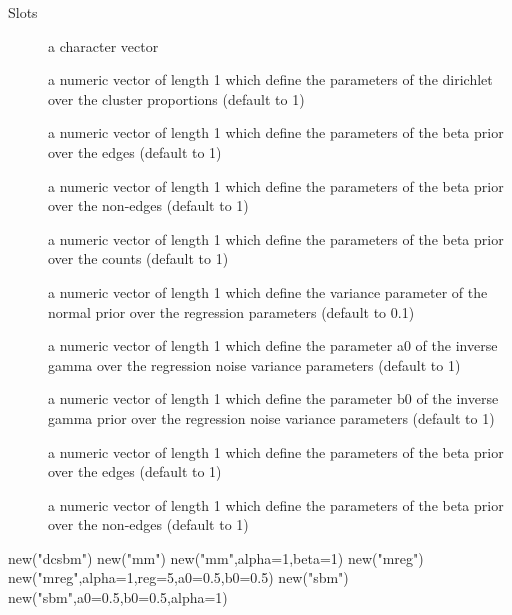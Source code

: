 \documentclass[letterpaper]{book}
\begin{document}
%
\begin{Section}{Slots}

\begin{description}

\item[] a character vector

\item[] a numeric vector of length 1 which define the parameters of the dirichlet over the cluster proportions (default to 1)

\item[] a numeric vector of length 1 which define the parameters of the beta prior over the edges (default to 1)

\item[] a numeric vector of length 1 which define the parameters of the beta prior over the non-edges (default to 1)

\item[] a numeric vector of length 1 which define the parameters of the beta prior over the counts (default to 1)

\item[] a numeric vector of length 1 which define the variance parameter of the normal prior over the regression parameters (default to 0.1)

\item[] a numeric vector of length 1 which define the parameter a0 of the inverse gamma over the regression noise variance parameters (default to 1)

\item[] a numeric vector of length 1 which define the parameter b0 of the inverse gamma prior over the regression noise variance parameters (default to 1)

\item[] a numeric vector of length 1 which define the parameters of the beta prior over the edges (default to 1)

\item[] a numeric vector of length 1 which define the parameters of the beta prior over the non-edges (default to 1)

\end{description}
\end{Section}
%
\begin{Examples}
\begin{ExampleCode}
new("dcsbm")
new("mm")
new("mm",alpha=1,beta=1)
new("mreg")
new("mreg",alpha=1,reg=5,a0=0.5,b0=0.5)
new("sbm")
new("sbm",a0=0.5,b0=0.5,alpha=1)
\end{ExampleCode}
\end{Examples}
\end{document}
